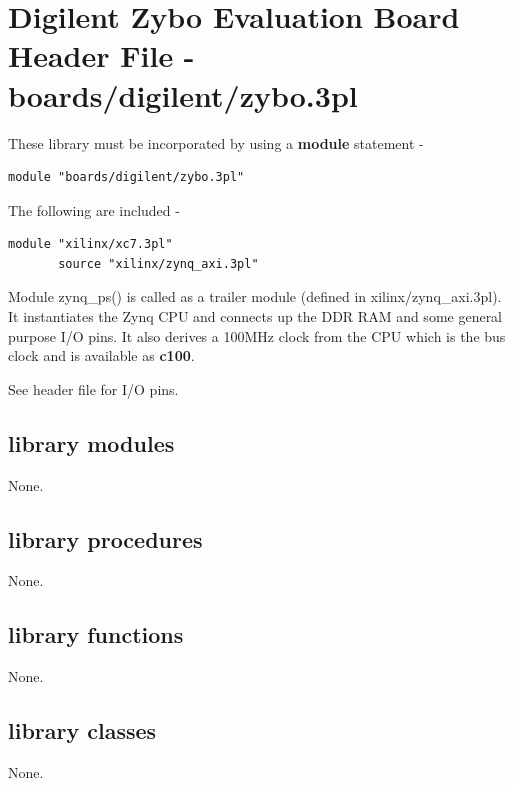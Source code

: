 \pagebreak

\section{Digilent Zybo Evaluation Board Header File - boards/digilent/zybo.3pl}

    
    These library must be incorporated by using a {\bf module} statement -
    \begin{lstlisting}[gobble=4, language=threepl]
       module "boards/digilent/zybo.3pl"
    \end{lstlisting}
    
    The following are included -
    \begin{lstlisting}[gobble=4, language=threepl]
       module "xilinx/xc7.3pl"
       source "xilinx/zynq_axi.3pl"
    \end{lstlisting}
    
    Module zynq\_ps() is called as a trailer module (defined in
    xilinx/zynq\_axi.3pl). It instantiates the Zynq CPU and connects up the DDR
    RAM and some general purpose I/O pins. It also derives a 100MHz clock from
    the CPU which is the bus clock and is available as {\bf c100}.
    
    See header file for I/O pins.
    




    \subsection{library modules}
    
        None.




    \subsection{library procedures}
    
        None.
        



    \subsection{library functions}
    
        None.



    \subsection{library classes}
    
        None.
